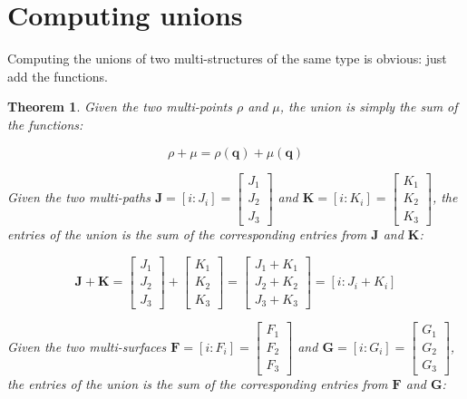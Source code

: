 \documentclass{book}
\newtheorem{thm}{Theorem}
\begin{document}
\section{Computing unions}

Computing the unions of two multi-structures of the same type is obvious: just add the functions.

\begin{thm}
Given the two multi-points \(\rho\) and \(\mu\), the union is simply the sum of the functions:

\[\rho + \mu = \rho(\mathbf{q}) + \mu(\mathbf{q})\]


Given the two multi-paths \(\mathbf{J} = [i : J_i] = \begin{bmatrix} J_1 \\ J_2 \\ J_3 \end{bmatrix}\) and \(\mathbf{K} = [i : K_i] = \begin{bmatrix} K_1 \\ K_2 \\ K_3 \end{bmatrix}\), the entries of the union is the sum of the corresponding entries from \(\mathbf{J}\) and \(\mathbf{K}\):

\[\mathbf{J} + \mathbf{K} = \begin{bmatrix} J_1 \\ J_2 \\ J_3 \end{bmatrix} + \begin{bmatrix} K_1 \\ K_2 \\ K_3 \end{bmatrix} = \begin{bmatrix} J_1 + K_1 \\ J_2 + K_2 \\ J_3 + K_3 \end{bmatrix} = [i : J_i + K_i]\]


Given the two multi-surfaces \(\mathbf{F} = [i : F_i] = \begin{bmatrix} F_1 \\ F_2 \\ F_3 \end{bmatrix}\) and \(\mathbf{G} = [i : G_i] = \begin{bmatrix} G_1 \\ G_2 \\ G_3 \end{bmatrix}\), the entries of the union is the sum of the corresponding entries from \(\mathbf{F}\) and \(\mathbf{G}\):


\end{thm}
\end{document}
